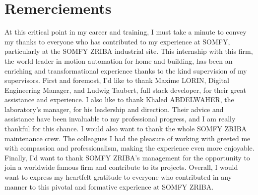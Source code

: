 \chapter*{Remerciements}

   At this critical point in my career and training, I must take a minute to convey my thanks to everyone who has contributed to my experience at SOMFY, particularly at the SOMFY ZRIBA industrial site. This internship with this firm, the world leader in motion automation for home and building, has been an enriching and transformational experience thanks to the kind supervision of my supervisors.
First and foremost, I'd like to thank Maxime LORIN, Digital Engineering Manager, and Ludwig Taubert, full stack developer, for their great assistance and experience.
I also like to thank Khaled ABDELWAHER, the laboratory's manager, for his leadership and direction. Their advice and assistance have been invaluable to my professional progress, and I am really thankful for this chance.
I would also want to thank the whole SOMFY ZRIBA maintenance crew. The colleagues I had the pleasure of working with greeted me with compassion and professionalism, making the experience even more enjoyable.
Finally, I'd want to thank SOMFY ZRIBA's management for the opportunity to join a worldwide famous firm and contribute to its projects.
Overall, I would want to express my heartfelt gratitude to everyone who contributed in any manner to this pivotal and formative experience at SOMFY ZRIBA.

